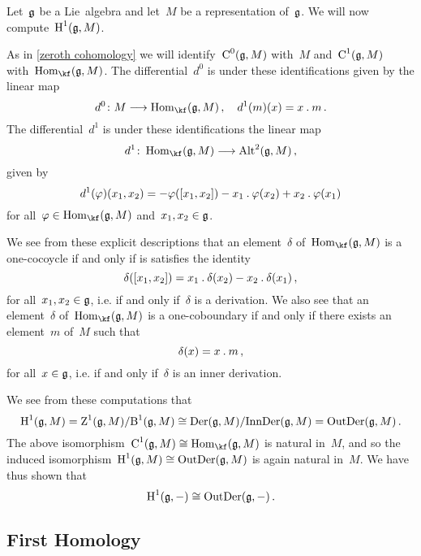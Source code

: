 \begin{fluff}
  Let~$\mathfrak{g}$ be a Lie~algebra and let~$M$ be a representation of~$\mathfrak{g}$.
  We will now compute~$\operatorname{H}^1(\mathfrak{g}, M)$.
  
  As in \cref{zeroth cohomology} we will identify~$\operatorname{C}^0(\mathfrak{g}, M)$ with~$M$ and~$\operatorname{C}^1(\mathfrak{g}, M)$ with~$\Hom_{\kf}(\glie, M)$.
  The differential~$d^0$ is under these identifications given by the linear map
  \[
    d^0
    \colon
    M
    \to
    \Hom_{\kf}(\glie, M) \,,
    \quad
    d^1(m)(x)
    =
    x \act m \,.
  \]
  The differential~$d^1$ is under these identifications the linear map
  \[
    d^1
    \colon
    \Hom_{\kf}(\glie, M)
    \to
    \Alt^2(\glie, M) \,,
  \]
  given by
  \[
    d^1(\varphi)(x_1, x_2)
    =
    - \varphi( [x_1, x_2] )
    - x_1 \mathbin{.} \varphi(x_2)
    + x_2 \mathbin{.} \varphi(x_1)
  \]
  for all~$\varphi \in \Hom_{\kf}(\glie, M)$ and~$x_1, x_2 \in \mathfrak{g}$.

  We see from these explicit descriptions that an element~$\delta$ of~$\Hom_{\kf}(\glie, M)$ is a one-cocoycle if and only if is satisfies the identity
  \[
    \delta( [x_1, x_2] )
    =
    x_1 \mathbin{.} \delta(x_2) - x_2 \mathbin{.} \delta(x_1) \,,
  \]
  for all~$x_1, x_2 \in \mathfrak{g}$, i.e. if and only if~$\delta$ is a derivation.
  We also see that an element~$\delta$ of~$\Hom_{\kf}(\glie, M)$ is a one-coboundary if and only if there exists an element~$m$ of~$M$ such that
  \[
    \delta(x)
    =
    x \mathbin{.} m \,,
  \]
  for all~$x \in \mathfrak{g}$, i.e. if and only if~$\delta$ is an inner derivation.
  
  We see from these computations that
  \[
    \operatorname{H}^1(\mathfrak{g}, M)
    =
    \operatorname{Z}^1(\mathfrak{g}, M) / {\operatorname{B}^1(\mathfrak{g}, M)}
    \cong
    \operatorname{Der}(\mathfrak{g}, M) / {\operatorname{InnDer}(\mathfrak{g}, M)}
    =
    \operatorname{OutDer}(\mathfrak{g}, M) \,.
  \]
  The above isomorphism~$\Chain^1(\glie, M) \cong \Hom_{\kf}(\glie, M)$ is natural in~$M$, and so the induced isomorphism~$\operatorname{H}^1(\mathfrak{g}, M) \cong \operatorname{OutDer}(\mathfrak{g}, M)$ is again natural in~$M$.
  We have thus shown that
  \[
    \operatorname{H}^1(\mathfrak{g}, -)
    \cong
    \operatorname{OutDer}(\mathfrak{g}, -) \,.
  \]
\end{fluff}




\subsection{First Homology}

